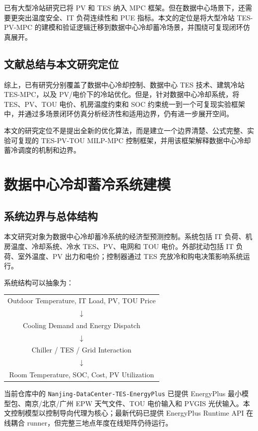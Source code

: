 \documentclass[UTF8,a4paper,12pt]{ctexrep}
\begin{document}
已有大型冷站研究已将 PV 和 TES 纳入 MPC 框架\citep{kim2022mpcTesPv}。但在数据中心场景下，还需要更突出温度安全、IT 负荷连续性和 PUE 指标。本文的定位是将大型冷站 TES-PV-MPC 的建模和验证逻辑迁移到数据中心冷却蓄冷场景，并围绕可复现闭环仿真展开。

\section{文献总结与本文研究定位}

综上，已有研究分别覆盖了数据中心冷却控制、数据中心 TES 技术、建筑冷站 TES-MPC，以及 PV/电价下的冷站优化。但是，针对数据中心冷却系统，将 TES、PV、TOU 电价、机房温度约束和 SOC 约束统一到一个可复现实验框架中，并通过多场景闭环仿真分析经济性和适用边界，仍有进一步展开空间。

本文的研究定位不是提出全新的优化算法，而是建立一个边界清楚、公式完整、实验可复现的 TES-PV-TOU MILP-MPC 控制框架，并用该框架解释数据中心冷却蓄冷调度的机制和边界。

\chapter{数据中心冷却蓄冷系统建模}

\section{系统边界与总体结构}

本文研究对象为数据中心冷却蓄冷系统的经济型预测控制。系统包括 IT 负荷、机房温度、冷却系统、冷水 TES、PV、电网和 TOU 电价。外部扰动包括 IT 负荷、室外温度、PV 出力和电价；控制器通过 TES 充放冷和购电决策影响系统运行。

系统结构可以抽象为：

\begin{center}
\begin{tabular}{c}
Outdoor Temperature, IT Load, PV, TOU Price \\
$\downarrow$ \\
Cooling Demand and Energy Dispatch \\
$\downarrow$ \\
Chiller / TES / Grid Interaction \\
$\downarrow$ \\
Room Temperature, SOC, Cost, PV Utilization
\end{tabular}
\end{center}

当前仓库中的 \texttt{Nanjing-DataCenter-TES-EnergyPlus} 已提供 EnergyPlus 最小模型包、南京/北京/广州 EPW 天气文件、TOU 电价输入和 PVGIS 光伏输入。本文控制模型以控制导向代理为核心；最新代码已提供 EnergyPlus Runtime API 在线耦合 runner，但完整三地点年度在线矩阵仍待运行。
\end{document}
